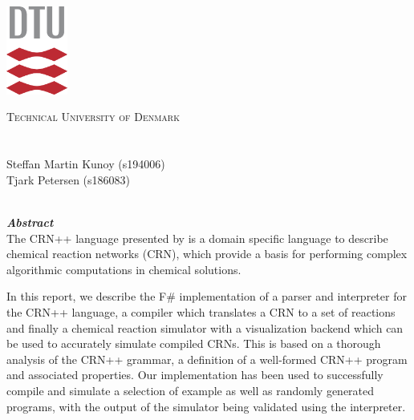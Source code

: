 \begin{titlepage}
    \begin{center}
        \includegraphics[width=0.15\textwidth]{Report/frontmatter/dtu.pdf}\par\vspace{0.5cm}
    
        {\scshape\LARGE Technical University of Denmark\\}
    	\vspace{0.5cm}
        {\large \coursenumber\;\coursename}\\
    	\vspace{1.5cm}
    	{\huge\bfseries \projectnamelong\\}
    	\vspace{1.5cm}
    	{\Large Steffan Martin Kunoy (s194006)\\}
            {\Large Tjark Petersen (s186083)\\}
        \vspace{1cm}
    	{\Large \thedate\\}
        \vspace{1cm}

    \end{center}    
    \textbf{\textit{Abstract}}\\
        The CRN++ language presented by \citeauthor{soloveichik2018a} is a domain specific language to describe chemical reaction networks (CRN), which provide a basis for performing complex algorithmic computations in chemical solutions.
        
        In this report, we describe the F\# implementation of a parser and interpreter for the CRN++ language, a compiler which translates a CRN to a set of reactions and finally a chemical reaction simulator with a visualization backend which can be used to accurately simulate compiled CRNs. This is based on a thorough analysis of the CRN++ grammar, a definition of a well-formed CRN++ program and associated properties. Our implementation has been used to successfully compile and simulate a selection of example as well as randomly generated programs, with the output of the simulator being validated using the interpreter.
 \vfill
\end{titlepage}
\restoregeometry